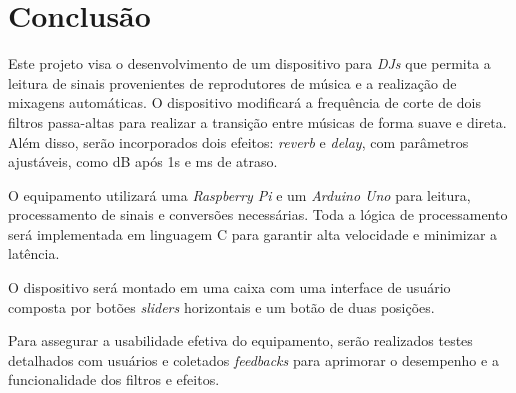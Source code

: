 \chapter[Conclusão]{Conclusão}

Este projeto visa o desenvolvimento de um dispositivo para \textit{DJs} que permita a leitura de sinais provenientes de reprodutores de música e a realização de mixagens automáticas. O dispositivo modificará a frequência de corte de dois filtros passa-altas para realizar a transição entre músicas de forma suave e direta. Além disso, serão incorporados dois efeitos: \textit{reverb} e \textit{delay}, com parâmetros ajustáveis, como dB após 1s e ms de atraso.

O equipamento utilizará uma \textit{Raspberry Pi} e um \textit{Arduino Uno} para leitura, processamento de sinais e conversões necessárias. Toda a lógica de processamento será implementada em linguagem C para garantir alta velocidade e minimizar a latência.

O dispositivo será montado em uma caixa com uma interface de usuário composta por botões \textit{sliders} horizontais e um botão de duas posições.

Para assegurar a usabilidade efetiva do equipamento, serão realizados testes detalhados com usuários e coletados \textit{feedbacks} para aprimorar o desempenho e a funcionalidade dos filtros e efeitos.